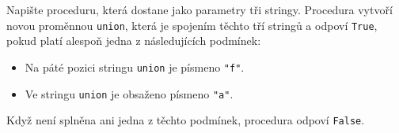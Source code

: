 \question[50]
Napište proceduru, která dostane jako parametry tři stringy. Procedura vytvoří
novou proměnnou \texttt{union}, která je spojením těchto tří stringů a odpoví
\texttt{True}, pokud platí alespoň jedna z následujících podmínek:
\begin{itemize}
	\item Na páté pozici stringu \texttt{union} je písmeno \texttt{"f"}.
	\item Ve stringu \texttt{union} je obsaženo písmeno \texttt{"a"}.
\end{itemize}
Když není splněna ani jedna z těchto podmínek, procedura odpoví \texttt{False}.